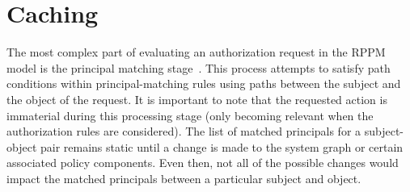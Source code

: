 \documentclass{article}
\begin{document}
\begin{comment}
\subsection{Changes to Request Evaluation}
The introduction of a negative principal-matching condition does not require any changes to the path-matching algorithm described in~\cite{CramptonS14}.
The principal matching stage of request evaluation does, however, require slight modification.
When each principal-matching rule is now evaluated, the path-matching algorithm may be called once or twice depending on whether both conditions are specified and, if they are, on whether the positive principal-matching condition is satisfied.

If only one condition is specified within the rule then the path-matching algorithm is only called once for that condition.
In the case of the positive principal-matching condition, a returned value of true indicates the condition was satisfied and therefore the principal of the rule is matched; a value of false indicates the condition was not satisfied and the principal does not match.
In contrast, in the case of the negative principal-matching condition being the sole condition within a rule, a value of true indicates the condition was satisfied and hence the principal does not match.
A returned value of false indicates the condition was not satisfied and, in this case, the principal is matched.

When a principal-matching rule contains both a positive and negative principal-matching condition the path-matching algorithm is first called with the positive condition.
In the case of a returned value of true the algorithm is called again but this time with the negative principal-matching condition.
If the second call returns true, then the principal does not match (as both conditions were satisfied); if it returns false, the principal is matched.
If on the other hand, the first call to the algorithm returns false, there is no need to call the algorithm again and the principal does not match.
\end{comment}

\section{Caching}\label{sec:caching}
The most complex part of evaluating an authorization request in the RPPM model is the principal matching stage~\cite[\S{3}]{CramptonS14}.
This process attempts to satisfy path conditions within principal-matching rules using paths between the subject and the object of the request.
It is important to note that the requested action is immaterial during this processing stage (only becoming relevant when the authorization rules are considered).
The list of matched principals for a subject-object pair remains static until a change is made to the system graph or certain associated policy components.
Even then, not all of the possible changes would impact the matched principals between a particular subject and object.
\end{document}
